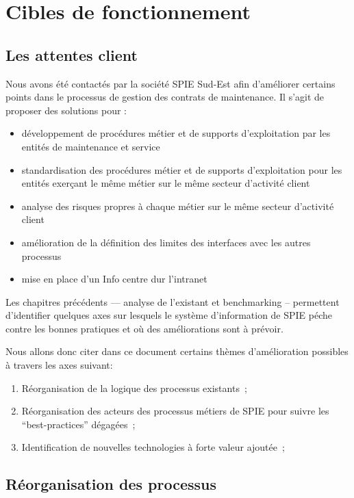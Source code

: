\chapter{Cibles de fonctionnement}

\section{Les attentes client}

Nous avons été contactés par la société SPIE Sud-Est afin d'améliorer certains points dans le processus de gestion des contrats de maintenance. Il s'agit de proposer des solutions pour : 

\begin{itemize}
    \item développement de procédures métier et de supports d'exploitation par les entités de maintenance et service
    \item standardisation des procédures métier et de supports d'exploitation pour les entités exerçant le même métier sur le même secteur d'activité client
    \item analyse des risques propres à chaque métier sur le même secteur d'activité client
    \item amélioration de la définition des limites des interfaces avec les autres processus
    \item mise en place d'un Info centre dur l'intranet
\end{itemize}

Les chapitres précédents --- analyse de l'existant et benchmarking -- permettent d'identifier quelques axes sur lesquels le système d'information de SPIE péche contre les bonnes pratiques et où des améliorations sont à prévoir.

    Nous allons donc citer dans ce document certains thèmes d'amélioration possibles à travers les axes suivant:

    \begin{enumerate}
        \item Réorganisation de la logique des processus existants~;
        \item Réorganisation des acteurs des processus métiers de SPIE pour suivre les ``best-practices'' dégagées~;
        \item Identification de nouvelles technologies à forte valeur ajoutée~;
    \end{enumerate}

\section{Réorganisation des processus}

